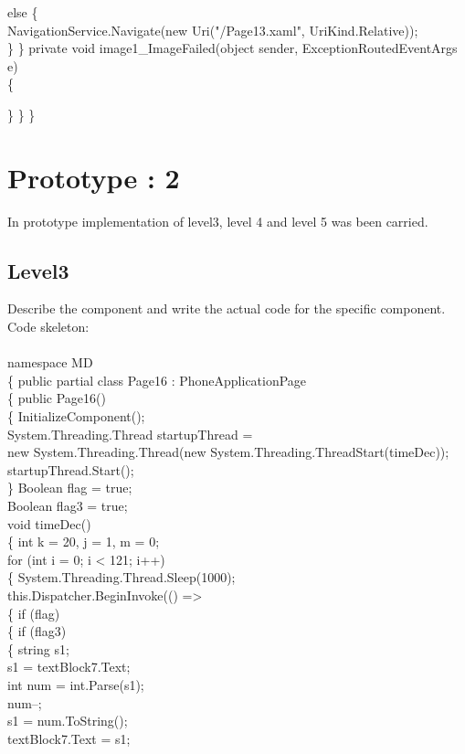 {{            else
            \{\\
                NavigationService.Navigate(new Uri("/Page13.xaml", UriKind.Relative));\\
            \}
        \}
        private void image1_ImageFailed(object sender, ExceptionRoutedEventArgs e)\\
        \{

        \}
    \}
\}


\section{Prototype : 2}
\hspace{1cm}In prototype  implementation of level3, level 4 and level 5  was been carried.

\subsection{Level3}
\ttfamily \hspace{1cm}Describe the component and write the actual code for the specific component.
Code skeleton:\\
\\
namespace MD\\
\{
    public partial class Page16 : PhoneApplicationPage\\
    \{
        public Page16()\\
        \{
            InitializeComponent();\\
            System.Threading.Thread startupThread =\\
                             new System.Threading.Thread(new System.Threading.ThreadStart(timeDec));\\
            startupThread.Start();\\
        \}
        Boolean flag = true;\\
        Boolean flag3 = true;\\
        void timeDec()\\
        \{
            int k = 20, j = 1, m = 0;\\
            
            for (int i = 0; i < 121; i++)\\
            \{
                System.Threading.Thread.Sleep(1000);\\

                this.Dispatcher.BeginInvoke(() =>\\
                \{
                    if (flag)\\
                    \{
                        if (flag3)\\
                        \{
                            string s1;\\
                            s1 = textBlock7.Text;\\
                            int num = int.Parse(s1);\\
                            num--;\\
                            s1 = num.ToString();\\
                            textBlock7.Text = s1;\\
                       
}}
